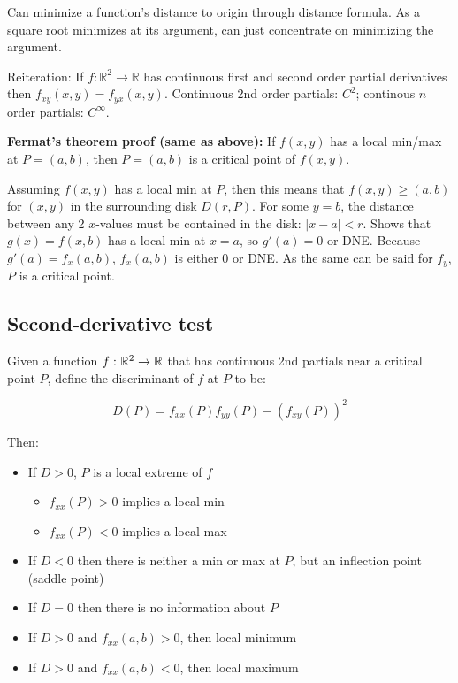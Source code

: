 Can minimize a function's distance to origin through distance formula. As a square root minimizes
at its argument, can just concentrate on minimizing the argument.

Reiteration: If $f: \mathbb{R}^{2} \rightarrow \mathbb{R}$ has continuous first and second order partial derivatives then $f_{x y}(x, y)=f_{y x}(x, y)$.
Continuous 2nd order partials: $C^2$; continous $n$ order partials: $C^\infty$.

\textbf{Fermat's theorem proof (same as above):} If $f(x,y)$ has a local min/max at $P=(a,b)$, then $P=(a,b)$ is a critical point of $f(x,y)$.

Assuming $f(x,y)$ has a local min at $P$, then this means that $f(x,y) \geq (a,b)$ for $(x,y)$ in the surrounding disk $D(r,P)$.
For some $y=b$, the distance between any 2 $x$-values must be contained in the disk: $|x-a|<r$. Shows that $g(x)=f(x,b)$ has a local min
at $x=a$, so $g'(a)=0$ or DNE. Because $g'(a)=f_x(a,b)$, $f_x(a,b)$ is either 0 or DNE. As the same can be said for $f_y$, $P$ is a critical point.

\subsection{Second-derivative test}

Given a function $f:\mathbb{R}^2 \rightarrow \mathbb{R}$ that has continuous 2nd partials near a critical point $P$, define
the discriminant of $f$ at $P$ to be:

\[D(P)=f_{x x}(P) f_{y y}(P)-\left(f_{x y}(P)\right)^{2}\]

Then:
\begin{itemize}
    \item If $D>0$, $P$ is a local extreme of $f$
    \begin{itemize}
        \item $f_{xx}(P)>0$ implies a local min
        \item $f_{xx}(P)<0$ implies a local max
    \end{itemize}
    \item If $D<0$ then there is neither a min or max at $P$, but an inflection point (saddle point)
    \item If $D=0$ then there is no information about $P$
    \item If $D>0$ and $f_{xx}(a,b)>0$, then local minimum
    \item If $D>0$ and $f_{xx}(a,b)<0$, then local maximum
\end{itemize}

